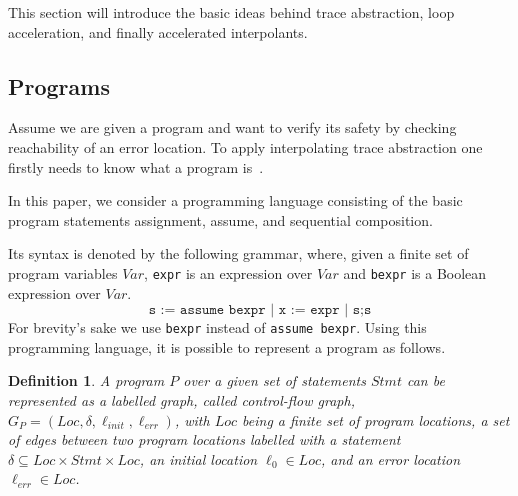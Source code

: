 \documentclass{article}
\newtheorem{mydef}{Definition}
\newcommand\mycom[1]{}
\newcommand\mycom[1]{#1}
\newcommand{\dd}[1]{\mycom{\todo[color=orange!40,inline]{\small DD: #1}}}
\newcommand{\ts}[1]{\mycom{\todo[color=green!40,inline]{\small TS: #1}}}
\begin{document}
This section will introduce the basic ideas behind trace abstraction, loop acceleration, and finally accelerated interpolants.

\subsection{Programs}
Assume we are given a program and want to verify its safety by checking reachability of an error location. 
To apply interpolating trace abstraction one firstly needs to know what a program is~\cite{DBLP:journals/corr/GreitschusDP17}.

In this paper, we consider a programming language consisting of the basic program statements assignment, assume, and sequential composition.
\dd{What about havoc?}
Its syntax is denoted by the following grammar, where, given a finite set of program variables $Var$, \texttt{expr} is an expression over $Var$ and \texttt{bexpr} is a Boolean expression over $Var$.
\begin{equation*}
    \texttt{s := assume bexpr | x := expr | s;s}
\end{equation*}
For brevity's sake we use \texttt{bexpr} instead of \texttt{assume bexpr}.
Using this programming language, it is possible to represent a program as follows.
\begin{mydef}
    A program $P$ over a given set of statements $Stmt$ can be represented as a labelled graph, called control-flow graph, 
    $G_P = (Loc, \delta, \ell_{init}, \ell_{err})$, with 
    $Loc$ being a finite set of program locations, 
    a set of edges between two program locations labelled with a statement $\delta \subseteq Loc \times Stmt \times Loc$, 
    an initial location $\ell_0 \in Loc$, and 
    an error location $\ell_{err} \in Loc$.\ts{It is strange to start a definition with ``can be represented''. Maybe define control-flow graph and, after the definition, say that a program can be represented as a cfg.}
\end{mydef}
\end{document}
